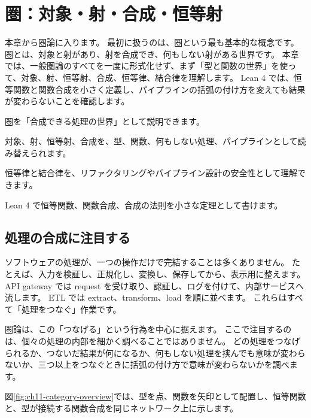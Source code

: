 \chapter{圏：対象・射・合成・恒等射}
\label{chap:ch11_category}

\begin{chapterabstract}
本章から圏論に入ります。
最初に扱うのは、圏という最も基本的な概念です。
圏とは、対象と射があり、射を合成でき、何もしない射がある世界です。
本章では、一般圏論のすべてを一度に形式化せず、まず「型と関数の世界」を使って、対象、射、恒等射、合成、恒等律、結合律を理解します。
Lean 4 では、恒等関数と関数合成を小さく定義し、パイプラインの括弧の付け方を変えても結果が変わらないことを確認します。
\end{chapterabstract}

\begin{learninggoals}
\item 圏を「合成できる処理の世界」として説明できます。
\item 対象、射、恒等射、合成を、型、関数、何もしない処理、パイプラインとして読み替えられます。
\item 恒等律と結合律を、リファクタリングやパイプライン設計の安全性として理解できます。
\item Lean 4 で恒等関数、関数合成、合成の法則を小さな定理として書けます。
\end{learninggoals}

\section{処理の合成に注目する}

ソフトウェアの処理が、一つの操作だけで完結することは多くありません。
たとえば、入力を検証し、正規化し、変換し、保存してから、表示用に整えます。
API gateway では request を受け取り、認証し、ログを付けて、内部サービスへ流します。
ETL では extract、transform、load を順に並べます。
これらはすべて「処理をつなぐ」作業です。

圏論は、この「つなげる」という行為を中心に据えます。
ここで注目するのは、個々の処理の内部を細かく調べることではありません。
どの処理をつなげられるか、つないだ結果が何になるか、何もしない処理を挟んでも意味が変わらないか、三つ以上をつなぐときに括弧の付け方で意味が変わらないかを調べます。

図\ref{fig:ch11-category-overview}では、型を点、関数を矢印として配置し、恒等関数と、型が接続する関数合成を同じネットワーク上に示します。

